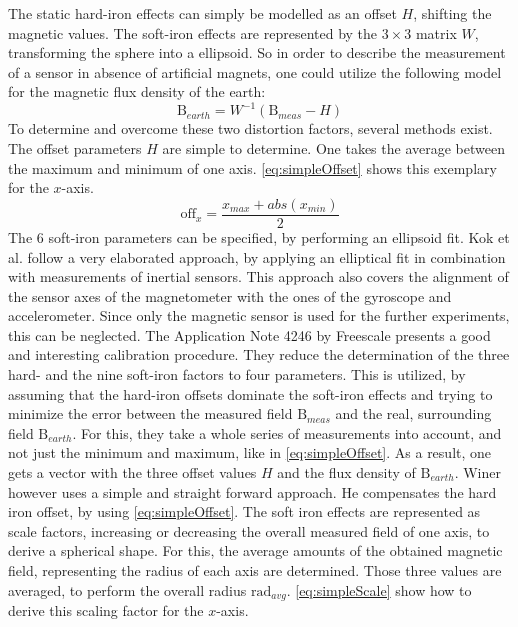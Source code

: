 The static hard-iron effects can simply be modelled as an offset $ H $, shifting the magnetic values. The soft-iron effects are represented by the $ 3\times3 $ matrix $ W $, transforming the sphere into a ellipsoid. So in order to describe the measurement of a sensor in absence of artificial magnets, one could utilize the following model for the magnetic flux density of the earth:
\begin{equation} \label{eq:hardSoftModel}
\mathrm{B}_{earth} = W^{-1} (\mathrm{B}_{meas} - H)
\end{equation}
To determine and overcome these two distortion factors, several methods exist. The offset parameters $ H $ are simple to determine. One takes the average between the maximum and minimum of one axis. \ref{eq:simpleOffset} shows this exemplary for the $ x $-axis.
\begin{equation} \label{eq:simpleOffset}
\mathrm{off}_{x} = \frac{x_{max} + abs(x_{min})}{2}
\end{equation}
The 6 soft-iron parameters can be specified, by performing an ellipsoid fit. Kok et al. follow a very elaborated approach, by applying an elliptical fit in combination with measurements of inertial sensors. This approach also covers the alignment of the sensor axes of the magnetometer with the ones of the gyroscope and accelerometer. Since only the magnetic sensor is used for the further experiments, this can be neglected. The Application Note 4246 by Freescale \cite{ozyagcilar2012calibrating} presents a good and interesting calibration procedure. They reduce the determination of the three hard- and the nine soft-iron factors to four parameters. This is utilized, by assuming that the hard-iron offsets dominate the soft-iron effects and trying to minimize the error between the measured field $ \mathrm{B}_{meas} $ and the real, surrounding field $ \mathrm{B}_{earth} $. For this, they take a whole series of measurements into account, and not just the minimum and maximum, like in \ref{eq:simpleOffset}. As a result, one gets a vector with the three offset values $ H $ and the flux density of $ \mathrm{B}_{earth} $. Winer \cite{Winer2015} however uses a simple and straight forward approach. He compensates the hard iron offset, by using \ref{eq:simpleOffset}. The soft iron effects are represented as scale factors, increasing or decreasing the overall measured field of one axis, to derive a spherical shape. For this, the average amounts of the obtained magnetic field, representing the \grqq radius \grqq of each axis are determined. Those three values are averaged, to perform the overall radius $ \mathrm{rad}_{avg} $. \ref{eq:simpleScale} show how to derive this scaling factor for the $ x $-axis.

